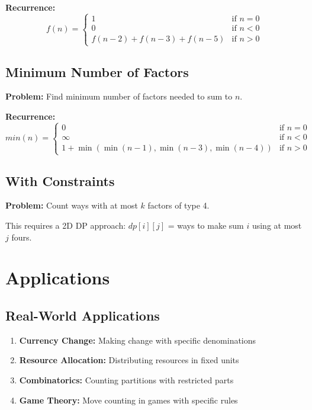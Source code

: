 \documentclass[12pt,a4paper]{article}
\begin{document}
\textbf{Recurrence:}
\begin{equation}
f(n) = \begin{cases}
1 & \text{if } n = 0 \\
0 & \text{if } n < 0 \\
f(n-2) + f(n-3) + f(n-5) & \text{if } n > 0
\end{cases}
\end{equation}

\subsection{Minimum Number of Factors}
\textbf{Problem:} Find minimum number of factors needed to sum to $n$.

\textbf{Recurrence:}
\begin{equation}
min(n) = \begin{cases}
0 & \text{if } n = 0 \\
\infty & \text{if } n < 0 \\
1 + \min(\min(n-1), \min(n-3), \min(n-4)) & \text{if } n > 0
\end{cases}
\end{equation}

\subsection{With Constraints}
\textbf{Problem:} Count ways with at most $k$ factors of type 4.

This requires a 2D DP approach: $dp[i][j]$ = ways to make sum $i$ using at most $j$ fours.

\section{Applications}

\subsection{Real-World Applications}
\begin{enumerate}
\item \textbf{Currency Change:} Making change with specific denominations
\item \textbf{Resource Allocation:} Distributing resources in fixed units
\item \textbf{Combinatorics:} Counting partitions with restricted parts
\item \textbf{Game Theory:} Move counting in games with specific rules
\end{enumerate}
\end{document}
